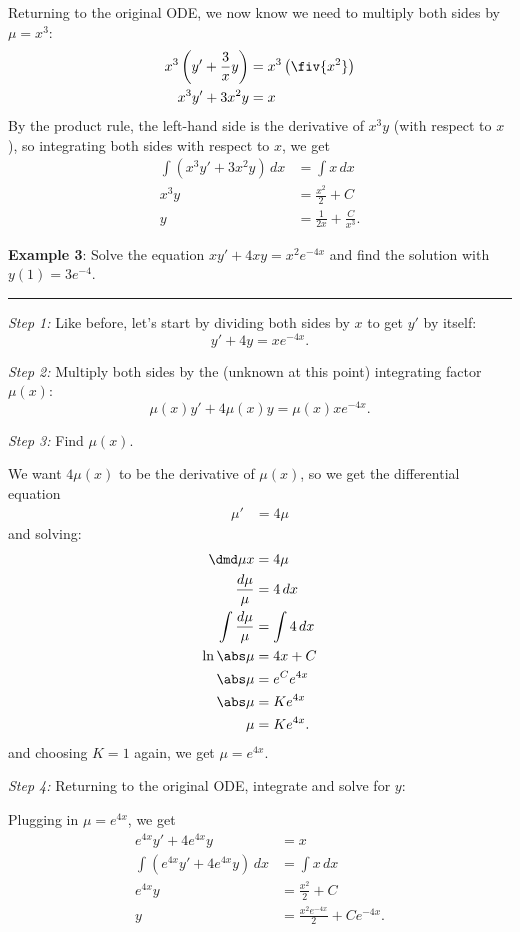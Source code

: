 \documentclass[11pt]{letter}
\begin{document}
Returning to the original ODE, we now know we need to multiply both sides by $\mu=x^3$:
\begin{align*}
	x^3\left(y' + \frac3x y\right) &= x^3\left(\fiv{x^2}\right)\\
	x^3y' + 3x^2y &= x
\end{align*}
By the product rule, the left-hand side is the derivative of $x^3y$ (with respect to $x$), so integrating both sides with respect to $x$, we get
\begin{align*}
	\int (x^3y'+3x^2y)\,dx &= \int x\,dx\\
	x^3y &= \frac{x^2}{2}+C\\
	y &= \frac{1}{2x}+\frac{C}{x^3}.
\end{align*}




\textbf{Example 3}: Solve the equation $xy'+4xy=x^2e^{-4x}$ and find the solution with $y(1)=3e^{-4}$.
\hrule

\textit{Step 1:} Like before, let's start by dividing both sides by $x$ to get $y'$ by itself:
\[
y' + 4y = xe^{-4x}.
\] 

\textit{Step 2:} Multiply both sides by the (unknown at this point) integrating factor $\mu(x)$:
\[
\mu(x)y' + 4\mu(x)y = \mu(x)xe^{-4x}.
\]

\textit{Step 3:} Find $\mu(x)$.

We want $4\mu(x)$ to be the derivative of $\mu(x)$, so we get the differential equation
\begin{align*}
	\mu'&=4\mu
\end{align*}
and solving:
\begin{align*}
	\dmd\mu x &= 4\mu\\
	\frac{d\mu}{\mu} &= 4\,dx\\
	\int\frac{d\mu}{\mu} &= \int 4\,dx\\
	\ln\abs\mu &= 4x + C\\
	\abs\mu &= e^Ce^{4x}\\
	\abs\mu &= Ke^{4x}\\
	\mu &= Ke^{4x}.
\end{align*}
and choosing $K=1$ again, we get $\mu=e^{4x}$.

\textit{Step 4:} Returning to the original ODE, integrate and solve for $y$:

Plugging in $\mu=e^{4x}$, we get
\begin{align*}
	e^{4x}y' + 4e^{4x}y &= x\\
	\int (e^{4x}y' + 4e^{4x}y)\,dx &= \int x\,dx\\
	e^{4x}y &= \frac{x^2}{2}+C\\
	y &= \frac{x^2e^{-4x}}{2} + Ce^{-4x}.
\end{align*}
\end{document}
